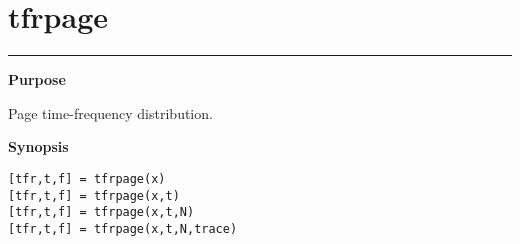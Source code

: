 

\section*{\hspace*{-1.6cm} tfrpage}

\vspace*{-.4cm}
\hspace*{-1.6cm}\rule[0in]{16.5cm}{.02cm}
\vspace*{.2cm}

{\bf \large \sf Purpose}\\
\hspace*{1.5cm}
\begin{minipage}[t]{13.5cm}
Page time-frequency distribution.
\end{minipage}
\vspace*{.5cm}

{\bf \large \sf Synopsis}\\
\hspace*{1.5cm}
\begin{minipage}[t]{13.5cm}
\begin{verbatim}
[tfr,t,f] = tfrpage(x)
[tfr,t,f] = tfrpage(x,t)
[tfr,t,f] = tfrpage(x,t,N)
[tfr,t,f] = tfrpage(x,t,N,trace)
\end{verbatim}
\end{minipage}
\vspace*{.5cm}

